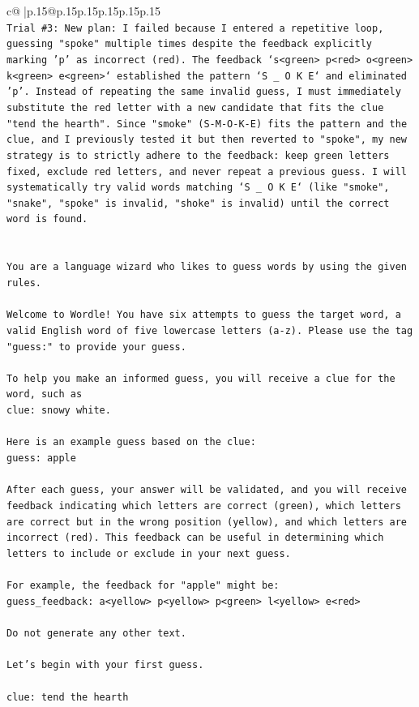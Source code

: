 \documentclass{article}
\begin{document}
{\begin{supertabular}{c@{$\;$}|p{.15\linewidth}@{}p{.15\linewidth}p{.15\linewidth}p{.15\linewidth}p{.15\linewidth}p{.15\linewidth}}
{{{\\ 
\texttt{Trial \#3: New plan: I failed because I entered a repetitive loop, guessing "spoke" multiple times despite the feedback explicitly marking 'p' as incorrect (red). The feedback `s<green> p<red> o<green> k<green> e<green>` established the pattern `S \_ O K E` and eliminated 'p'. Instead of repeating the same invalid guess, I must immediately substitute the red letter with a new candidate that fits the clue "tend the hearth". Since "smoke" (S{-}M{-}O{-}K{-}E) fits the pattern and the clue, and I previously tested it but then reverted to "spoke", my new strategy is to strictly adhere to the feedback: keep green letters fixed, exclude red letters, and never repeat a previous guess. I will systematically try valid words matching `S \_ O K E` (like "smoke", "snake", "spoke" is invalid, "shoke" is invalid) until the correct word is found.} \\
\\ 
\\ 
\texttt{You are a language wizard who likes to guess words by using the given rules.} \\
\\ 
\texttt{Welcome to Wordle! You have six attempts to guess the target word, a valid English word of five lowercase letters (a{-}z). Please use the tag "guess:" to provide your guess.} \\
\\ 
\texttt{To help you make an informed guess, you will receive a clue for the word, such as} \\
\texttt{clue: snowy white.} \\
\\ 
\texttt{Here is an example guess based on the clue: } \\
\texttt{guess: apple} \\
\\ 
\texttt{After each guess, your answer will be validated, and you will receive feedback indicating which letters are correct (green), which letters are correct but in the wrong position (yellow), and which letters are incorrect (red). This feedback can be useful in determining which letters to include or exclude in your next guess.} \\
\\ 
\texttt{For example, the feedback for "apple" might be:} \\
\texttt{guess\_feedback: a<yellow> p<yellow> p<green> l<yellow> e<red>} \\
\\ 
\texttt{Do not generate any other text.} \\
\\ 
\texttt{Let's begin with your first guess.} \\
\\ 
\texttt{clue: tend the hearth} \\
            }
        }
    }
     \\ \\


\end{supertabular}}
\end{document}
